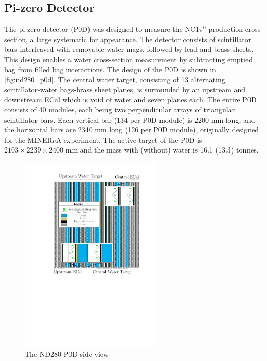 \subsection{Pi-zero Detector}
The pi-zero detector (P0D)\cite{t2k_p0d} was designed to measure the NC1$\pi^0$ production cross-section, a large systematic for \nue appearance. The detector consists of scintillator bars interleaved with removable water mags, followed by lead and brass sheets. This design enables a water cross-section measurement by subtracting emptied bag from filled bag interactions. The design of the P0D is shown in \autoref{fig:nd280_p0d}. The central water target, consisting of 13 alternating scintillator-water bags-brass sheet planes, is surrounded by an upstream and downstream ECal which is void of water and seven planes each. The entire P0D consists of 40 modules, each being two perpendicular arrays of triangular scintillator bars. Each vertical bar (134 per P0D module) is 2200 mm long, and the horizontal bars are 2340 mm long (126 per P0D module), originally designed for the MINER$\nu$A experiment\cite{minerva_design}. The active target of the P0D is $2103\times2239\times2400\text{ mm}$ and the mass with (without) water is 16.1 (13.3) tonnes.
\begin{figure}[h]
	\includegraphics[width=0.6\textwidth, trim={0mm 110mm 0mm 0mm}, clip,page=1]{figures/det_chap/p0d/p0d.pdf}
	\caption{The ND280 P0D side-view}
	\label{fig:nd280_p0d}
\end{figure}


